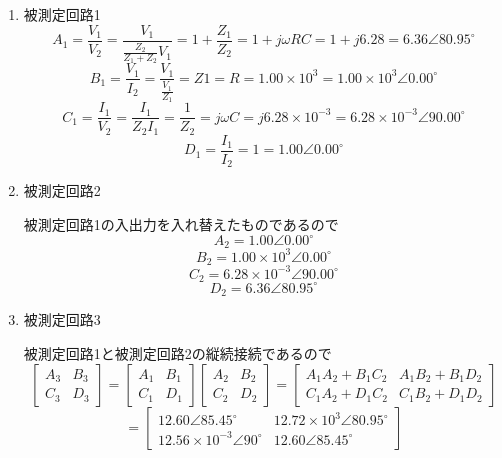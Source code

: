     \begin{enumerate}
        \item 被測定回路1
        $$
        A_1=\frac{V_1}{V_2}=\frac{V_1}{\frac{Z_2}{Z_1+Z_2}V_1}=1+\frac{Z_1}{Z_2}=1+j\omega RC=1+j6.28=6.36\angle80.95^\circ
        $$
        $$
        B_1=\frac{V_1}{I_2}=\frac{V_1}{\frac{V_1}{Z_1}}=Z1=R=1.00\times10^3=1.00\times10^3\angle0.00^\circ
        $$
        $$
        C_1=\frac{I_1}{V_2}=\frac{I_1}{Z_2I_1}=\frac{1}{Z_2}=j\omega C=j6.28\times10^{-3}=6.28\times10^{-3}\angle90.00^\circ
        $$
        $$
        D_1=\frac{I_1}{I_2}=1=1.00\angle0.00^\circ
        $$
        \item 被測定回路2
        
        被測定回路1の入出力を入れ替えたものであるので
        $$
        A_2=1.00\angle0.00^\circ
        $$
        $$
        B_2=1.00\times10^3\angle0.00^\circ
        $$
        $$
        C_2=6.28\times10^{-3}\angle90.00^\circ
        $$
        $$
        D_2=6.36\angle80.95^\circ
        $$
        \item 被測定回路3
        
        被測定回路1と被測定回路2の縦続接続であるので
        $$
        \left[\begin{array}{ll}
        A_3 & B_3 \\
        C_3 & D_3
        \end{array}\right]=\left[\begin{array}{ll}
        A_1 & B_1 \\
        C_1 & D_1
        \end{array}\right]\left[\begin{array}{ll}
        A_2 & B_2 \\
        C_2 & D_2
        \end{array}\right]=\left[\begin{array}{ll}
        A_1A_2+B_1C_2 & A_1B_2+B_1D_2 \\
        C_1A_2+D_1C_2 & C_1B_2+D_1D_2
        \end{array}\right]
        $$
        $$
        =\left[\begin{array}{ll}
        12.60\angle85.45^\circ & 12.72\times10^3\angle80.95^\circ \\
        12.56\times10^{-3}\angle90^\circ & 12.60\angle85.45^\circ
        \end{array}\right]
        $$
    \end{enumerate}

\newpage

